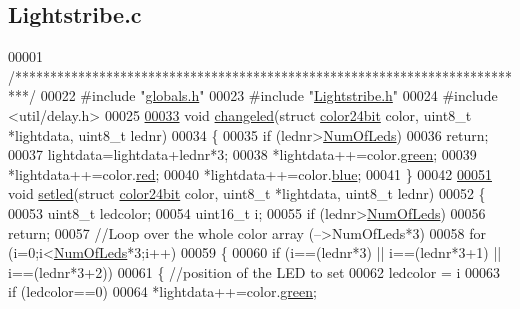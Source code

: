 \hypertarget{_lightstribe_8c_source}{}\subsection{Lightstribe.\+c}

\begin{DoxyCode}
00001 \textcolor{comment}{/**************************************************************************/}
00022 \textcolor{preprocessor}{#include "\hyperlink{globals_8h}{globals.h}"}
00023 \textcolor{preprocessor}{#include "\hyperlink{_lightstribe_8h}{Lightstribe.h}"}
00024 \textcolor{preprocessor}{#include <util/delay.h>}
00025 
\hypertarget{_lightstribe_8c_source_l00033}{}\hyperlink{_lightstribe_8h_a63fa595d401f0e85c1bba55ba2b1d66e}{00033} \textcolor{keywordtype}{void} \hyperlink{_lightstribe_8c_a63fa595d401f0e85c1bba55ba2b1d66e}{changeled}(\textcolor{keyword}{struct} \hyperlink{structcolor24bit}{color24bit} color, uint8\_t *lightdata, uint8\_t lednr)
00034 \{
00035     \textcolor{keywordflow}{if} (lednr>\hyperlink{globals_8h_ad5db4045aed262ed4aae2af9d81fab98}{NumOfLeds})
00036         \textcolor{keywordflow}{return};
00037     lightdata=lightdata+lednr*3;
00038     *lightdata++=color.\hyperlink{structcolor24bit_a90d21fa503b626c00cdc8d94863d5877}{green};
00039     *lightdata++=color.\hyperlink{structcolor24bit_ad47d918910aaa51c73160ac85999d09c}{red};
00040     *lightdata++=color.\hyperlink{structcolor24bit_a287b397e90d7b995c81ff54e741f96b2}{blue};
00041 \}
00042 
\hypertarget{_lightstribe_8c_source_l00051}{}\hyperlink{_lightstribe_8h_abba9462833e30ef725eaf18c3d01eb71}{00051} \textcolor{keywordtype}{void} \hyperlink{_lightstribe_8c_abba9462833e30ef725eaf18c3d01eb71}{setled}(\textcolor{keyword}{struct} \hyperlink{structcolor24bit}{color24bit} color, uint8\_t *lightdata, uint8\_t lednr)
00052 \{
00053     uint8\_t ledcolor;
00054     uint16\_t i;
00055     \textcolor{keywordflow}{if} (lednr>\hyperlink{globals_8h_ad5db4045aed262ed4aae2af9d81fab98}{NumOfLeds})
00056         \textcolor{keywordflow}{return};
00057     \textcolor{comment}{//Loop over the whole color array (-->NumOfLeds*3)}
00058     \textcolor{keywordflow}{for} (i=0;i<\hyperlink{globals_8h_ad5db4045aed262ed4aae2af9d81fab98}{NumOfLeds}*3;i++)
00059     \{
00060         \textcolor{keywordflow}{if} (i==(lednr*3) || i==(lednr*3+1) || i==(lednr*3+2))
00061         \{   \textcolor{comment}{//position of the LED to set}
00062             ledcolor = i%
00063             \textcolor{keywordflow}{if} (ledcolor==0)
00064                 *lightdata++=color.\hyperlink{structcolor24bit_a90d21fa503b626c00cdc8d94863d5877}{green};

\end{DoxyCode}
